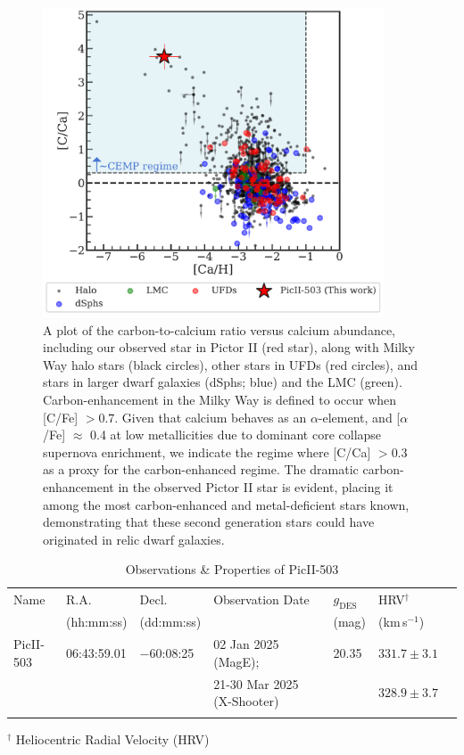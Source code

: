 \documentclass[pdflatex,sn-nature]{sn-jnl}%
\theoremstyle{thmstyleone}%
\theoremstyle{thmstyletwo}%
\theoremstyle{thmstylethree}%
\begin{document}
\begin{figure}[h]
\centering
\includegraphics[width=0.9\textwidth]{f3.pdf}
\caption{A plot of the carbon-to-calcium ratio versus calcium abundance, including our observed star in Pictor II (red star), along with Milky Way halo stars (black circles), other stars in UFDs (red circles), and stars in larger dwarf galaxies (dSphs; blue) and the LMC (green).
Carbon-enhancement in the Milky Way is defined to occur when [C/Fe] $> 0.7$.
Given that calcium behaves as an $\alpha$-element, and [$\alpha$/Fe] $\approx$ 0.4 at low metallicities due to dominant core collapse supernova enrichment\cite{ww+95}, we indicate the regime where [C/Ca] $> 0.3$ as a proxy for the carbon-enhanced regime.
The dramatic carbon-enhancement in the observed Pictor II star is evident, placing it among the most carbon-enhanced and metal-deficient stars known, demonstrating that these second generation stars could have originated in relic dwarf galaxies. 
}
\label{fig:abundances}
\end{figure}

\begin{table}[h]
\caption{Observations \& Properties of PicII-503}\label{tab:obs}
\begin{tabular}{@{}lllllll@{}}
\toprule
Name & R.A. & Decl. & Observation Date & $g_{\text{DES}}$ & HRV$^\dagger$ &\\
& (hh:mm:ss) & (dd:mm:ss) & & (mag) & (km\,s$^{-1}$)\\
\midrule
PicII-503    & 06:43:59.01   & $-60$:08:25  & 02 Jan 2025 (MagE); & 20.35 & $331.7 \pm 3.1$ \\
 &  &  & 21-30 Mar 2025 (X-Shooter) &  & $328.9 \pm 3.7$ \\
\botrule
\end{tabular}
$^\dagger$ Heliocentric Radial Velocity (HRV)
\end{table}
\end{document}
